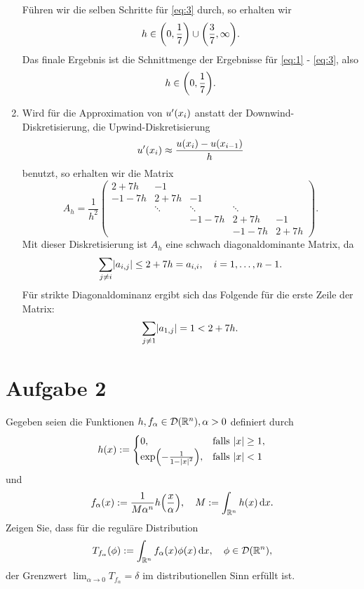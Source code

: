 \documentclass{exercise}
\begin{document}
\begin{enumerate}
        Führen wir die selben Schritte für \eqref{eq:3} durch, so erhalten wir
        \[
            h \in \parentheses*{0, \frac{1}{7}} \cup \parentheses*{\frac{3}{7}, \infty}.
        \]
        Das finale Ergebnis ist die Schnittmenge der Ergebnisse für \eqref{eq:1} - \eqref{eq:3}, also
        \[
            h \in \parentheses*{0, \frac{1}{7}}.
        \]
        \item Wird für die Approximation von \(u'\parentheses*{x_i}\) anstatt der Downwind-Diskretisierung, die Upwind-Diskretisierung
        \[
            u'\parentheses*{x_i} \approx \frac{u\parentheses*{x_i} - u\parentheses*{x_{i - 1}}}{h}
        \]
        benutzt, so erhalten wir die Matrix
        \[
            A_h = \frac{1}{h^2}\begin{pmatrix}
                2 + 7h & -1\\
                -1 - 7h & 2 + 7h & -1\\
                & \ddots & \ddots & \ddots\\
                & & -1 - 7h & 2 + 7h & -1\\
                & & & -1 - 7h & 2 + 7h
            \end{pmatrix}.
        \]
        Mit dieser Diskretisierung ist \(A_h\) eine schwach diagonaldominante Matrix, da
        \[
            \sum_{j \ne i}\absolute*{a_{i, j}} \le 2 + 7h = a_{i, i}, \quad i = 1, \ldots, n - 1.
        \]
        Für strikte Diagonaldominanz ergibt sich das Folgende für die erste Zeile der Matrix:
        \[
            \sum_{j \ne 1}\absolute*{a_{1, j}} = 1 < 2 + 7h.
        \]
    \end{enumerate}


    \section*{Aufgabe 2}
    
    \begin{problem}
        Gegeben seien die Funktionen \(h, f_\alpha \in \mathcal{D}\parentheses*{\R^n}, \alpha > 0\) definiert durch
        \[
            h\parentheses*{x} := \begin{cases}
                0, & \text{falls }\absolute*{x} \ge 1,\\
                \exp\parentheses*{-\frac{1}{1 - \absolute*{x}^2}}, & \text{falls }\absolute*{x} < 1
            \end{cases}
        \]
        und
        \[
            f_\alpha\parentheses*{x} := \frac{1}{M\alpha^n}h\parentheses*{\frac{x}{\alpha}}, \quad M := \int_{\R^n}h\parentheses*{x}\d x.
        \]
        Zeigen Sie, dass für die reguläre Distribution
        \[
            T_{f_\alpha}\parentheses*{\phi} := \int_{\R^n}f_\alpha\parentheses*{x}\phi\parentheses*{x}\d x, \quad \phi \in \mathcal{D}\parentheses*{\R^n},
        \]
        der Grenzwert \(\lim_{\alpha \to 0}T_{f_\alpha} = \delta\) im distributionellen Sinn erfüllt ist.
    \end{problem}
    
\end{document}
